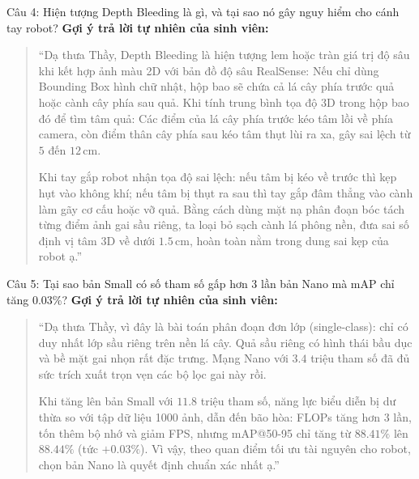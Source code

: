 \documentclass[11pt,a4paper]{article}
\begin{document}
\vspace{6pt}

\begin{ansbox}{Câu 4: Hiện tượng Depth Bleeding là gì, và tại sao nó gây nguy hiểm cho cánh tay robot?}
\textbf{Gợi ý trả lời tự nhiên của sinh viên:}
\begin{quote}
``Dạ thưa Thầy, Depth Bleeding là hiện tượng lem hoặc tràn giá trị độ sâu khi kết hợp ảnh màu 2D với bản đồ độ sâu RealSense:
Nếu chỉ dùng Bounding Box hình chữ nhật, hộp bao sẽ chứa cả lá cây phía trước quả hoặc cành cây phía sau quả. Khi tính trung bình tọa độ 3D trong hộp bao đó để tìm tâm quả:
Các điểm của lá cây phía trước kéo tâm lồi về phía camera, còn điểm thân cây phía sau kéo tâm thụt lùi ra xa, gây sai lệch từ $5$ đến $12\,\text{cm}$.

Khi tay gắp robot nhận tọa độ sai lệch: nếu tâm bị kéo về trước thì kẹp hụt vào không khí; nếu tâm bị thụt ra sau thì tay gắp đâm thẳng vào cành làm gãy cơ cấu hoặc vỡ quả. Bằng cách dùng mặt nạ phân đoạn bóc tách từng điểm ảnh gai sầu riêng, ta loại bỏ sạch cành lá phông nền, đưa sai số định vị tâm 3D về dưới $1.5\,\text{cm}$, hoàn toàn nằm trong dung sai kẹp của robot ạ.''
\end{quote}
\end{ansbox}

\vspace{6pt}

\begin{ansbox}{Câu 5: Tại sao bản Small có số tham số gấp hơn 3 lần bản Nano mà mAP chỉ tăng 0.03\%?}
\textbf{Gợi ý trả lời tự nhiên của sinh viên:}
\begin{quote}
``Dạ thưa Thầy, vì đây là bài toán phân đoạn đơn lớp (single-class): chỉ có duy nhất lớp sầu riêng trên nền lá cây. Quả sầu riêng có hình thái bầu dục và bề mặt gai nhọn rất đặc trưng. Mạng Nano với $3.4$ triệu tham số đã đủ sức trích xuất trọn vẹn các bộ lọc gai này rồi.

Khi tăng lên bản Small với $11.8$ triệu tham số, năng lực biểu diễn bị dư thừa so với tập dữ liệu 1000 ảnh, dẫn đến bão hòa: FLOPs tăng hơn 3 lần, tốn thêm bộ nhớ và giảm FPS, nhưng mAP@50-95 chỉ tăng từ $88.41\%$ lên $88.44\%$ (tức $+0.03\%$). Vì vậy, theo quan điểm tối ưu tài nguyên cho robot, chọn bản Nano là quyết định chuẩn xác nhất ạ.''
\end{quote}
\end{ansbox}

\newpage

\end{document}
